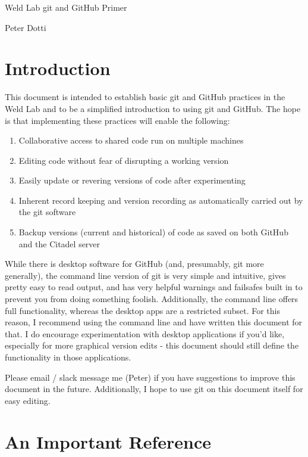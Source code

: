 \documentclass[11pt]{article}
\begin{document}
\begin{center}
{\Large Weld Lab git and GitHub Primer}

Peter Dotti
\end{center}

\tableofcontents
\newpage
\section{Introduction}

This document is intended to establish basic git and GitHub practices in the Weld Lab and to be a simplified introduction to using git and GitHub.  The hope is that implementing these practices will enable the following:

\begin{enumerate}
\item Collaborative access to shared code run on multiple machines
\item Editing code without fear of disrupting a working version
\item Easily update or revering versions of code after experimenting
\item Inherent record keeping and version recording as automatically carried out by the git software
\item Backup versions (current and historical) of code as saved on both GitHub and the Citadel server
\end{enumerate}

While there is desktop software for GitHub (and, presumably, git more generally), the command line version of git is very simple and intuitive, gives pretty easy to read output, and has very helpful warnings and failsafes built in to prevent you from doing something foolish.  Additionally, the command line offers full functionality, whereas the desktop apps are a restricted subset.  For this reason, I recommend using the command line and have written this document for that.  I do encourage experimentation with desktop applications if you'd like, especially for more graphical version edits - this document should still define the functionality in those applications.

Please email / slack message me (Peter) if you have suggestions to improve this document in the future.  Additionally, I hope to use git on this document itself for easy editing.

\section{An Important Reference}
\end{document}
